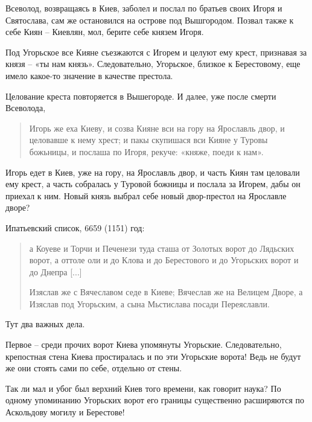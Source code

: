Всеволод, возвращаясь в Киев, заболел и послал по братьев своих Игоря и Святослава, сам же остановился на острове под Вышгородом. Позвал также к себе Киян – Киевлян, мол, берите себе князем Игоря.

Под Угорьское все Кияне съезжаются с Игорем и целуют ему крест, признавая за князя – «ты нам князь». Следовательно, Угорьское, близкое к Берестовому, еще имело какое-то значение в качестве престола.

Целование креста повторяется в Вышегороде. И далее, уже после смерти Всеволода, 

\begin{quotation}
Игорь же еха Киеву, и созва Кияне вси на гору на Ярославль двор, и целовавше к нему хрест; и пакы скупишася вси Кияне у Туровы божьницы, и послаша по Игоря, рекуче: «княже, поеди к нам».
\end{quotation}

Игорь едет в Киев, уже на гору, на Ярославль двор, и часть Киян там целовали ему крест, а часть собралась у Туровой божницы и послала за Игорем, дабы он приехал к ним. Новый князь выбрал себе новый двор-престол на Ярославле дворе? 




Ипатьевский список, 6659 (1151) год:

\begin{quotation}
а Коуеве и Торчи и Печенези туда сташа от Золотых ворот до Лядьских ворот, а оттоле оли и до Клова и до Берестового и до Угорьских ворот и до Днепра [...]

Изяслав же с Вячеславом седе в Киеве; Вячеслав же на Велицем Дворе, а Изяслав под Угорьским, а сына Мьстислава посади Переяславли.
\end{quotation}

Тут два важных дела. 

Первое – среди прочих ворот Киева упомянуты Угорьские. Следовательно, крепостная стена Киева простиралась и по эти Угорьские ворота! Ведь не будут же они стоять сами по себе, отдельно от стены.

Так ли мал и убог был верхний Киев того времени, как говорит наука? По одному упоминанию Угорьских ворот его границы существенно расширяются по Аскольдову могилу и Берестове!

